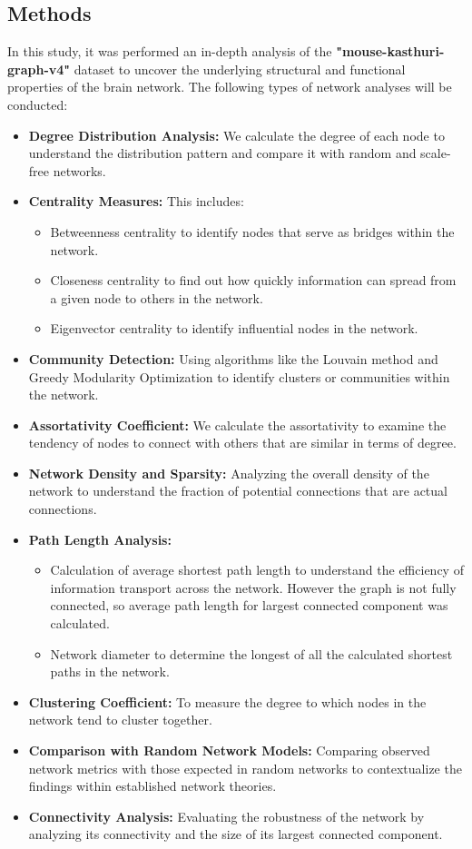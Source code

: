 \documentclass[
	report, %
	11pt, %
]{CSUniSchoolLabReport}
\begin{document}
	\subsection{Methods}
		In this study, it was performed an in-depth analysis of the \textbf{"mouse-kasthuri-graph-v4"} dataset to uncover the underlying structural and functional properties of the brain network. The following types of network analyses will be conducted:
		\vspace{10pt}
		\begin{itemize}
		\item \textbf{Degree Distribution Analysis:} We calculate the degree of each node to understand the distribution pattern and compare it with random and scale-free networks.
		\item \textbf{Centrality Measures:} This includes:
		\begin{itemize}
			\item Betweenness centrality to identify nodes that serve as bridges within the network.
			\item Closeness centrality to find out how quickly information can spread from a given node to others in the network.
			\item Eigenvector centrality to identify influential nodes in the network.
		\end{itemize}
		\item \textbf{Community Detection:} Using algorithms like the Louvain method and Greedy Modularity Optimization to identify clusters or communities within the network.
		\item \textbf{Assortativity Coefficient:} We calculate the assortativity to examine the tendency of nodes to connect with others that are similar in terms of degree.
		\item \textbf{Network Density and Sparsity:} Analyzing the overall density of the network to understand the fraction of potential connections that are actual connections.
		\item \textbf{Path Length Analysis:}
		\begin{itemize}
			\item Calculation of average shortest path length to understand the efficiency of information transport across the network. However the graph is not fully connected, so average path length for largest connected component was calculated.
			\item Network diameter to determine the longest of all the calculated shortest paths in the network.
		\end{itemize}
		\item \textbf{Clustering Coefficient:} To measure the degree to which nodes in the network tend to cluster together.
		\item \textbf{Comparison with Random Network Models:} Comparing observed network metrics with those expected in random networks to contextualize the findings within established network theories.
		\item \textbf{Connectivity Analysis:} Evaluating the robustness of the network by analyzing its connectivity and the size of its largest connected component.
		\end{itemize}
		\vspace{10pt}
\end{document}
